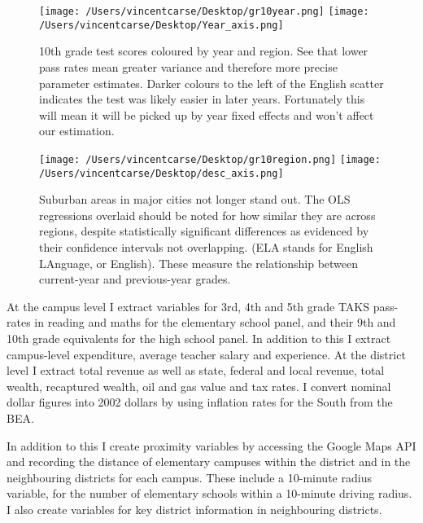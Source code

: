 \documentclass[11pt]{article}
\begin{document}
\begin{figure}
    \label{image-myimage}
    \texttt{[image: /Users/vincentcarse/Desktop/gr10year.png]}
    \texttt{[image: /Users/vincentcarse/Desktop/Year\_axis.png]}
    \caption{10th grade test scores coloured by year and region. See that lower pass rates mean greater variance and therefore more precise parameter estimates. Darker colours to the left of the English scatter indicates the test was likely easier in later years. Fortunately this will mean it will be picked up by year fixed effects and won't affect our estimation.}
\end{figure}

\begin{figure}
    \label{image-myimage}
    \texttt{[image: /Users/vincentcarse/Desktop/gr10region.png]}
    \texttt{[image: /Users/vincentcarse/Desktop/desc\_axis.png]}
    \caption{Suburban areas in major cities not longer stand out. The OLS regressions overlaid should be noted for how similar they are across regions, despite statistically significant differences as evidenced by their confidence intervals not overlapping. (ELA stands for English LAnguage, or English). These measure the relationship between current-year and previous-year grades.}
\end{figure}

At the campus level I extract variables for 3rd, 4th and 5th grade TAKS pass-rates in reading and maths for the elementary school panel, and their 9th and 10th grade equivalents for the high school panel. In addition to this I extract campus-level expenditure, average teacher salary and experience. At the district level I extract total revenue as well as state, federal and local revenue, total wealth, recaptured wealth, oil and gas value and tax rates. I convert nominal dollar figures into 2002 dollars by using inflation rates for the South from the BEA.

In addition to this I create proximity variables by accessing the Google Maps API and recording the distance of elementary campuses within the district and in the neighbouring districts for each campus. These include a 10-minute radius variable, for the number of elementary schools within a 10-minute driving radius. I also create variables for key district information in neighbouring districts.
\end{document}
